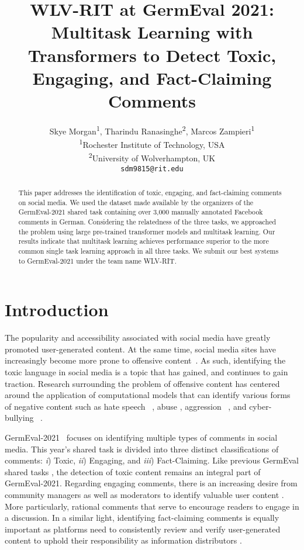 \documentclass[11pt,a4paper]{article}
\title{WLV-RIT at GermEval 2021: Multitask Learning with Transformers to Detect Toxic, Engaging, and Fact-Claiming Comments}
\author{Skye Morgan\textsuperscript{1}, Tharindu Ranasinghe\textsuperscript{2}, Marcos Zampieri\textsuperscript{1} \\
  \textsuperscript{1}Rochester Institute of Technology, USA\\
  \textsuperscript{2}University of Wolverhampton, UK \\
  \texttt{sdm9815@rit.edu} 
  }
\date{}
\begin{document}
\maketitle
\begin{abstract}
This paper addresses the identification of toxic, engaging, and fact-claiming comments on social media. We used the dataset made available by the organizers of the GermEval-2021 shared task containing over 3,000 manually annotated Facebook comments in German. Considering the relatedness of the three tasks, we approached the problem using large pre-trained transformer models and multitask learning. Our results indicate that multitask learning achieves performance superior to the more common single task learning approach in all three tasks. We submit our best systems to GermEval-2021 under the team name WLV-RIT. 
\end{abstract}

\section{Introduction}
\label{sec:intro}

The popularity and accessibility associated with social media have greatly promoted user-generated content. At the same time, social media sites have increasingly become more prone to offensive content~\cite{hada-etal-2021-ruddit,zhu-bhat-2021-generate,bucur-etal-2021-exploratory}. As such, identifying the toxic language in social media is a topic that has gained, and continues to gain traction. Research surrounding the problem of offensive content has centered around the application of computational models that can identify various forms of negative content such as hate speech ~\cite{malmasi2018challenges,nozza-2021-exposing}, abuse \cite{corazza-etal-2020-hybrid}, aggression ~\cite{kumar2018benchmarking,kumar-etal-2020-evaluating}, and cyber-bullying ~\cite{rosa2019automatic,cheng-etal-2021-mitigating,salawu-etal-2021-large}.

GermEval-2021~\cite{germeval2021overview} focuses on identifying multiple types of comments in social media. This year's shared task is divided into three distinct classifications of comments:  {\it i}) Toxic, {\it ii}) Engaging, and {\it iii}) Fact-Claiming. Like previous GermEval shared tasks \cite{germeval-2019}, the detection of toxic content remains an integral part of GermEval-2021. Regarding engaging comments, there is an increasing desire from community managers as well as moderators to identify valuable user content \cite{kolhatkar2017using,napoles2017finding}. More particularly, rational comments that serve to encourage readers to engage in a discussion. In a similar light, identifying fact-claiming comments is equally important as platforms need to consistently review and verify user-generated content to uphold their responsibility as information distributors \cite{mihaylova2018fact,shaar2020overview}. 
\end{document}
